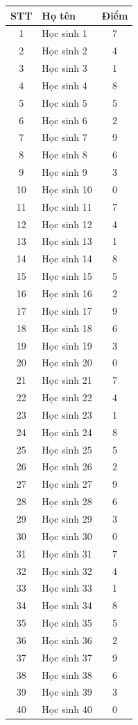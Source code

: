 \documentclass[12pt]{article}
\begin{document}
\begin{longtable}{|c|l|c|}
\hline
STT & Họ tên & Điểm \\ \hline
 
1 & Học sinh 1 & 7 \\ \hline
2 & Học sinh 2 & 4 \\ \hline
3 & Học sinh 3 & 1 \\ \hline
4 & Học sinh 4 & 8 \\ \hline
5 & Học sinh 5 & 5 \\ \hline
6 & Học sinh 6 & 2 \\ \hline
7 & Học sinh 7 & 9 \\ \hline
8 & Học sinh 8 & 6 \\ \hline
9 & Học sinh 9 & 3 \\ \hline
10 & Học sinh 10 & 0 \\ \hline
11 & Học sinh 11 & 7 \\ \hline
12 & Học sinh 12 & 4 \\ \hline
13 & Học sinh 13 & 1 \\ \hline
14 & Học sinh 14 & 8 \\ \hline
15 & Học sinh 15 & 5 \\ \hline
16 & Học sinh 16 & 2 \\ \hline
17 & Học sinh 17 & 9 \\ \hline
18 & Học sinh 18 & 6 \\ \hline
19 & Học sinh 19 & 3 \\ \hline
20 & Học sinh 20 & 0 \\ \hline
21 & Học sinh 21 & 7 \\ \hline
22 & Học sinh 22 & 4 \\ \hline
23 & Học sinh 23 & 1 \\ \hline
24 & Học sinh 24 & 8 \\ \hline
25 & Học sinh 25 & 5 \\ \hline
26 & Học sinh 26 & 2 \\ \hline
27 & Học sinh 27 & 9 \\ \hline
28 & Học sinh 28 & 6 \\ \hline
29 & Học sinh 29 & 3 \\ \hline
30 & Học sinh 30 & 0 \\ \hline
31 & Học sinh 31 & 7 \\ \hline
32 & Học sinh 32 & 4 \\ \hline
33 & Học sinh 33 & 1 \\ \hline
34 & Học sinh 34 & 8 \\ \hline
35 & Học sinh 35 & 5 \\ \hline
36 & Học sinh 36 & 2 \\ \hline
37 & Học sinh 37 & 9 \\ \hline
38 & Học sinh 38 & 6 \\ \hline
39 & Học sinh 39 & 3 \\ \hline
40 & Học sinh 40 & 0 \\ \hline
\end{longtable}
\end{document}
